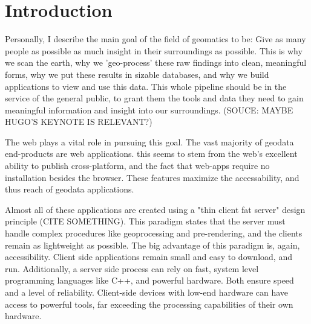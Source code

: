 \newpage
\section{Introduction}




Personally, I describe the main goal of the field of geomatics to be: Give as many people as possible as much insight in their surroundings as possible.
This is why we scan the earth, why we 'geo-process' these raw findings into clean, meaningful forms, why we put these results in sizable databases, and why we build applications to view and use this data.
This whole pipeline should be in the service of the general public, to grant them the tools and data they need to gain meaningful information and insight into our surroundings. (SOUCE: MAYBE HUGO'S KEYNOTE IS RELEVANT?)


The web plays a vital role in pursuing this goal. The vast majority of geodata end-products are web applications. this seems to stem from the web's excellent ability to publish cross-platform, and the fact that web-apps require no installation besides the browser. These features maximize the accessability, and thus reach of geodata applications.

Almost all of these applications are created using a "thin client fat server" design principle (CITE SOMETHING). 
This paradigm states that the server must handle complex procedures like geoprocessing and pre-rendering, and the clients remain as lightweight as possible. 
The big advantage of this paradigm is, again, accessibility. 
Client side applications remain small and easy to download,  and run. 
Additionally, a server side process can rely on fast, system level programming languages like C++, and powerful hardware. Both ensure speed and a level of reliability.  Client-side devices with low-end hardware can have access to powerful tools, far exceeding the processing capabilities of their own hardware. 

